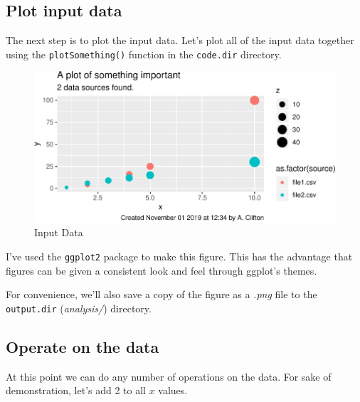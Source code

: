 \documentclass[11pt,]{article}
\newenvironment{Shaded}{\begin{snugshade}}{\end{snugshade}}
\newcommand{\FloatTok}[1]{\textcolor[rgb]{0.00,0.00,0.81}{#1}}
\newcommand{\NormalTok}[1]{#1}
\newcommand{\OperatorTok}[1]{\textcolor[rgb]{0.81,0.36,0.00}{\textbf{#1}}}
\newcommand{\StringTok}[1]{\textcolor[rgb]{0.31,0.60,0.02}{#1}}
\begin{document}
\hypertarget{plot-input-data}{%
\subsection{Plot input data}\label{plot-input-data}}

The next step is to plot the input data. Let's plot all of the input data together using the \texttt{plotSomething()} function in the \texttt{code.dir} directory.

\begin{figure}
\centering
\includegraphics{main_files/figure-latex/plot-input-data-1.pdf}
\caption{\label{fig:plot-input-data}Input Data}
\end{figure}

I've used the \texttt{ggplot2} package to make this figure. This has the advantage that figures can be given a consistent look and feel through ggplot's themes.

For convenience, we'll also save a copy of the figure as a \emph{.png} file to the \texttt{output.dir} (\emph{analysis/}) directory.

\hypertarget{operate-on-the-data}{%
\subsection{Operate on the data}\label{operate-on-the-data}}

At this point we can do any number of operations on the data. For sake of demonstration, let's add 2 to all \(x\) values.

\begin{Shaded}
\end{Shaded}
\end{document}
